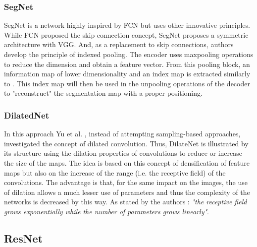 \subsubsection{SegNet}

SegNet \cite{DBLP:journals/corr/BadrinarayananH15} is a network highly inspired by FCN but uses other innovative principles. While FCN proposed the skip connection concept, SegNet proposes a symmetric architecture with VGG.
And, as a replacement to skip connections, authors develop the principle of indexed pooling. The encoder uses maxpooling operations to reduce the dimension and obtain a feature vector. From this pooling block, an information map of lower dimensionality and an index map is extracted similarly to \cite{zeiler2014visualizing}. This index map will then be used in the unpooling operations of the decoder to "reconstruct" the segmentation map with a proper positioning. 



\subsubsection{DilatedNet}

In this approach Yu et al. \cite{yu2015multi}, instead of attempting sampling-based approaches, investigated the concept of dilated convolution. Thus, DilateNet is illustrated by its structure using the dilation properties of convolutions to reduce or increase the size of the maps. The idea is based on this concept of densification of feature maps but also on the increase of the range (i.e. the receptive field) of the convolutions. The advantage is that, for the same impact on the images, the use of dilation allows a much lesser use of parameters and thus the complexity of the networks is decreased by this way. As stated by the authors : \emph{"the receptive field grows exponentially while the number of parameters grows linearly"}.


\subsection{ResNet}\label{seg3}

